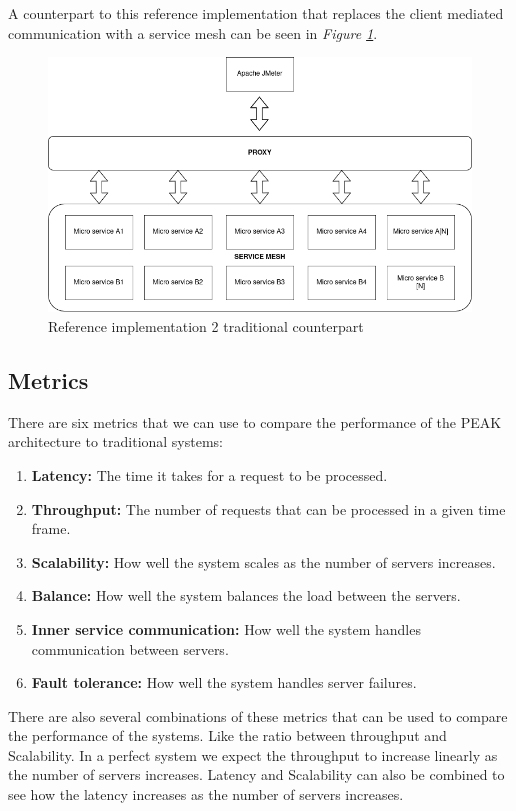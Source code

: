 \documentclass[12pt]{article}
\begin{document}
A counterpart to this reference implementation that replaces the client mediated communication with a service mesh can be seen in \textit{Figure \ref{fig:test-two-traditional}}.

\begin{figure}[H]
    \centering
    \includegraphics[width=\textwidth]{test-two-traditional.drawio.png}
    \caption{Reference implementation 2 traditional counterpart}
    \label{fig:test-two-traditional}
\end{figure}

\subsection{Metrics}
There are six metrics that we can use to compare the performance of the PEAK architecture to traditional systems:
\begin{enumerate}
    \item \textbf{Latency:} The time it takes for a request to be processed.
    \item \textbf{Throughput:} The number of requests that can be processed in a given time frame.
    \item \textbf{Scalability:} How well the system scales as the number of servers increases.
    \item \textbf{Balance:} How well the system balances the load between the servers.
    \item \textbf{Inner service communication:} How well the system handles communication between servers.
    \item \textbf{Fault tolerance:} How well the system handles server failures.
\end{enumerate}
There are also several combinations of these metrics that can be used to compare the performance of the systems.
Like the ratio between throughput and Scalability. In a perfect system we expect the throughput to increase linearly as the number of servers increases.
Latency and Scalability can also be combined to see how the latency increases as the number of servers increases. 
\end{document}
